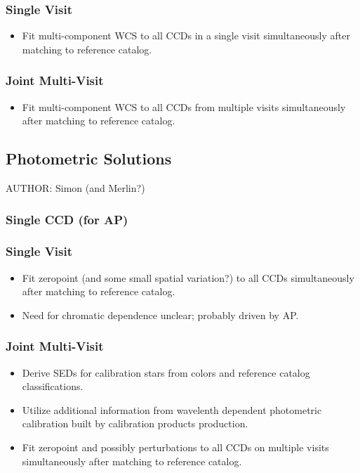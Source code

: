 \subsubsection{Single Visit}
\begin{itemize}
\item Fit multi-component WCS to all CCDs in a single visit simultaneously after matching to reference catalog.
\end{itemize}
\subsubsection{Joint Multi-Visit}
\begin{itemize}
\item Fit multi-component WCS to all CCDs from multiple visits simultaneously after matching to reference catalog.
\end{itemize}

\subsection{Photometric Solutions}
AUTHOR: Simon (and Merlin?)
\subsubsection{Single CCD (for AP)}
\subsubsection{Single Visit}
\begin{itemize}
\item Fit zeropoint (and some small spatial variation?) to all CCDs simultaneously after matching to reference catalog.
\item Need for chromatic dependence unclear; probably driven by AP.
\end{itemize}
\subsubsection{Joint Multi-Visit}
\begin{itemize}
\item Derive SEDs for calibration stars from colors and reference catalog classifications.
\item Utilize additional information from wavelenth dependent photometric calibration built by calibration products production.
\item Fit zeropoint and possibly perturbations to all CCDs on multiple visits simultaneously after matching to reference catalog.
\end{itemize}

